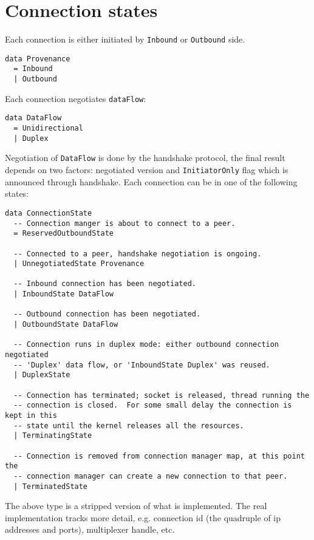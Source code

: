 \documentclass{article}
\begin{document}
\section{Connection states}

Each connection is either initiated by \texttt{Inbound} or \texttt{Outbound} side.
\begin{lstlisting}
data Provenance
  = Inbound
  | Outbound
\end{lstlisting}
Each connection negotiates \texttt{dataFlow}:
\begin{lstlisting}
data DataFlow
  = Unidirectional
  | Duplex
\end{lstlisting}
Negotiation of \texttt{DataFlow} is done by the handshake protocol, the final
result depends on two factors: negotiated version and \texttt{InitiatorOnly}
flag which is announced through handshake.  Each connection can be in one
of the following states:
\begin{lstlisting}
data ConnectionState
  -- Connection manger is about to connect to a peer.
  = ReservedOutboundState

  -- Connected to a peer, handshake negotiation is ongoing.
  | UnnegotiatedState Provenance

  -- Inbound connection has been negotiated.
  | InboundState DataFlow

  -- Outbound connection has been negotiated.
  | OutboundState DataFlow

  -- Connection runs in duplex mode: either outbound connection negotiated
  -- 'Duplex' data flow, or 'InboundState Duplex' was reused.
  | DuplexState

  -- Connection has terminated; socket is released, thread running the
  -- connection is closed.  For some small delay the connection is kept in this
  -- state until the kernel releases all the resources.
  | TerminatingState

  -- Connection is removed from connection manager map, at this point the
  -- connection manager can create a new connection to that peer.
  | TerminatedState
\end{lstlisting}
The above type is a stripped version of what is implemented.  The real
implementation tracks more detail, e.g. connection id (the quadruple of ip
addresses and ports), multiplexer handle, etc.
\end{document}
